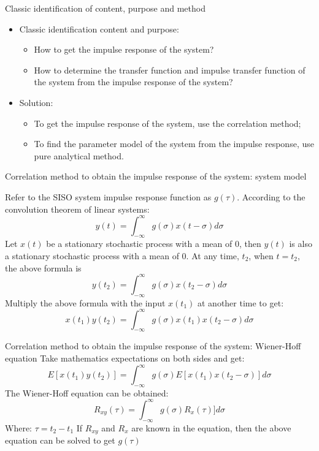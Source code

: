 \begin{frame}{Classic identification of content, purpose and method}
\begin{itemize}
\item Classic identification content and purpose:
\begin{itemize}
\item How to get the impulse response of the system?
\item How to determine the transfer function and impulse transfer function of the system from the impulse response of the system?
\end{itemize}
\item Solution:
\begin{itemize}
\item To get the impulse response of the system, use the correlation method;
\item To find the parameter model of the system from the impulse response, use pure analytical method.
\end{itemize}
\end{itemize}
\end{frame}


\begin{frame}{Correlation method to obtain the impulse response of the system: system model}

Refer to the SISO system impulse response function as $g(\tau)$. According to the convolution theorem of linear systems:
$$
y(t)=\int_{-\infty}^{\infty} g(\sigma)x(t-\sigma)d\sigma
$$
Let $x(t)$ be a stationary stochastic process with a mean of $0$, then $y(t)$ is also a stationary stochastic process with a mean of $0$. At any time, $t_2$, when $t=t_2$, the above formula is
$$
y(t_2)=\int_{-\infty}^{\infty} g(\sigma)x(t_2-\sigma)d\sigma
$$
Multiply the above formula with the input $x(t_1)$ at another time to get:
$$
x(t_1)y(t_2)=\int_{-\infty}^{\infty} g(\sigma)x(t_1)x(t_2-\sigma)d\sigma
$$
\end{frame}

\begin{frame}{Correlation method to obtain the impulse response of the system: Wiener-Hoff equation}
Take mathematics expectations on both sides and get:
$$
E[x(t_1)y(t_2)]=\int_{-\infty}^{\infty} g(\sigma)E[x(t_1)x(t_2-\sigma)]d\sigma
$$
The Wiener-Hoff equation can be obtained:
$$
R_{xy}(\tau)=\int_{-\infty}^{\infty} g(\sigma)R_x(\tau)]d\sigma
$$
Where: $\tau=t_2-t_1$
If $R_{xy}$ and $R_x$ are known in the equation, then the above equation can be solved to get $g(\tau)$
\end{frame}

